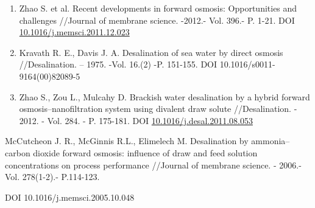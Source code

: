 \begin{references}
\begin{enumerate}
\def\labelenumi{\arabic{enumi}.}
\setcounter{enumi}{10}
\item
  Zhao S. et al. Recent developments in forward osmosis: Opportunities
  and challenges //Journal of membrane science. -2012.- Vol. 396.- P.
  1-21. DOI
  \href{http://dx.doi.org/10.1016/j.memsci.2011.12.023}{10.1016/j.memsci.2011.12.023}
\item
  Kravath R. E., Davis J. A. Desalination of sea water by direct osmosis
  //Desalination. -- 1975. -Vol. 16.(2) -P. 151-155. DOI
  10.1016/s0011-9164(00)82089-5~
\item
  Zhao S., Zou L., Mulcahy D. Brackish water desalination by a hybrid
  forward osmosis--nanofiltration system using divalent draw solute
  //Desalination. - 2012. - Vol. 284. - P. 175-181. DOI
  \href{http://dx.doi.org/10.1016/j.desal.2011.08.053}{10.1016/j.desal.2011.08.053}
\end{enumerate}

McCutcheon J. R., McGinnis R.L., Elimelech M. Desalination by
ammonia--carbon dioxide forward osmosis: influence of draw and feed
solution concentrations on process performance //Journal of membrane
science. - 2006.-Vol. 278(1-2).- P.114-123.

DOI 10.1016/j.memsci.2005.10.048


\end{references}
